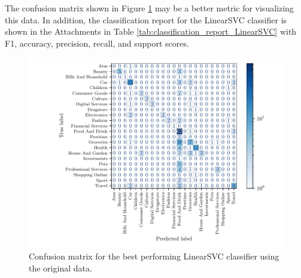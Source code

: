 The confusion matrix shown in Figure \ref{fig:confusion_matrix} may be a better metric for visualizing this data. In addition, the classification report for the LinearSVC classifier is shown in the Attachments in Table \ref{tab:classification_report_LinearSVC} with F1, accuracy, precision, recall, and support scores.

\begin{figure}[ht]
  \centering
  \includegraphics[width=\scale\textwidth]{../img/plot_cm_LinearSVC_original.pdf}
  \caption{Confusion matrix for the best performing LinearSVC classifier using the original data.}
  \label{fig:confusion_matrix}
\end{figure}



